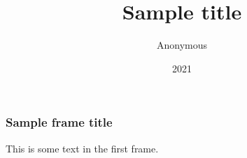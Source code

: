 \documentclass{beamer}
\title{Sample title}
\author{Anonymous}
\institute{Overleaf}
\date{2021}
\begin{document}
\frame{\titlepage}
\begin {frame}
\frametitle{Sample frame title}
This is some text in the first frame.
\end {frame}
\end{document}
